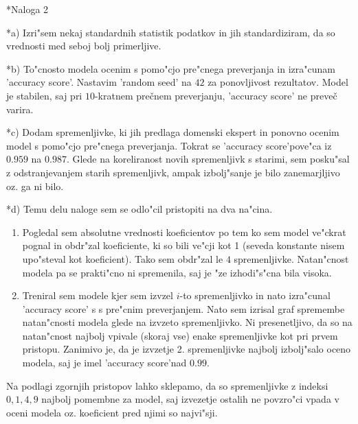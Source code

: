 \documentclass[a4paper, 10pt]{article}
\begin{document}
\begin{subsection}*{Naloga 2}

    \begin{subsubsection}*{a)}
        Izri"sem nekaj standardnih statistik podatkov in jih standardiziram, da so vrednosti med seboj 
        bolj primerljive.
    \end{subsubsection}

    \begin{subsubsection}*{b)}
        To"cnosto modela ocenim s pomo"cjo pre"cnega preverjanja in izra"cunam 'accuracy score'.
        Nastavim 'random seed' na $42$ za ponovljivost rezultatov. Model je stabilen, saj pri $10$-kratnem
        prečnem preverjanju, 'accuracy score' ne preveč varira.
    \end{subsubsection}

    \begin{subsubsection}*{c)}
        Dodam spremenljivke, ki jih predlaga domenski ekspert in ponovno ocenim model s pomo"cjo 
        pre"cnega preverjanja. Tokrat se 'accuracy score'pove"ca iz $0.959$ na $0.987$. Glede na 
        koreliranost novih spremenljivk s starimi, sem posku"sal z odstranjevanjem starih spremenljivk, 
        ampak izbolj"sanje je bilo zanemarjljivo oz. ga ni bilo.
    \end{subsubsection}

    \begin{subsubsection}*{d)}
        Temu delu naloge sem se odlo"cil pristopiti na dva na"cina.
        \begin{enumerate}
            \item Pogledal sem absolutne vrednosti koeficientov po tem ko sem model ve"ckrat pognal in 
            obdr"zal koeficiente, ki so bili ve"cji kot 1 (seveda konstante nisem upo"steval kot koeficient).
            Tako sem obdr"zal le $4$ spremenljivke. Natan"cnost modela pa se prakti"cno ni spremenila, 
            saj je "ze izhodi"s"cna bila visoka. 
            \item Treniral sem modele kjer sem izvzel $i$-to spremenljivko in nato izra"cunal 'accuracy score' s 
            s pre"cnim preverjanjem. Nato sem izrisal graf spremembe natan"cnosti modela glede na izvzeto spremenljivko.
            Ni presenetljivo, da so na natan"cnost najbolj vpivale (skoraj vse) enake spremenljivke kot pri prvem pristopu. 
            Zanimivo je, da je izvzetje 2. spremenljivke najbolj izbolj"salo oceno modela, saj je imel 
            'accuracy score'nad $0.99$. 
        \end{enumerate}

        Na podlagi zgornjih pristopov lahko sklepamo, da so spremenljivke z indeksi 
        $0, 1, 4, 9$ najbolj pomembne za model, saj izvezetje ostalih ne povzro"ci vpada v 
        oceni modela oz. koeficient pred njimi so najvi"sji.
    \end{subsubsection}
\end{subsection}
\end{document}
